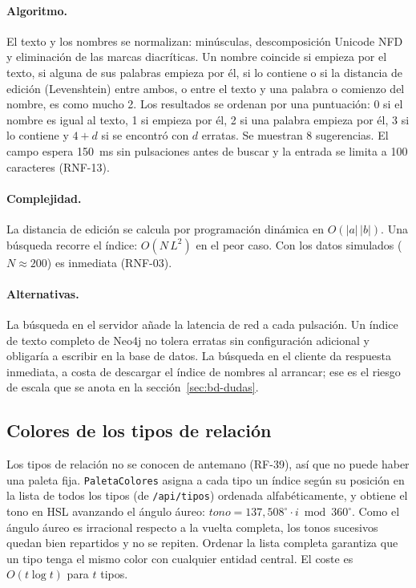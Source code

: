 \paragraph{Algoritmo.} El texto y los nombres se normalizan: minúsculas, descomposición Unicode NFD y eliminación de las marcas diacríticas. Un nombre coincide si empieza por el texto, si alguna de sus palabras empieza por él, si lo contiene o si la distancia de edición (Levenshtein) entre ambos, o entre el texto y una palabra o comienzo del nombre, es como mucho 2. Los resultados se ordenan por una puntuación: 0 si el nombre es igual al texto, 1 si empieza por él, 2 si una palabra empieza por él, 3 si lo contiene y $4+d$ si se encontró con $d$ erratas. Se muestran 8 sugerencias. El campo espera 150~ms sin pulsaciones antes de buscar y la entrada se limita a 100 caracteres (RNF-13).

\paragraph{Complejidad.} La distancia de edición se calcula por programación dinámica en $O(|a|\,|b|)$. Una búsqueda recorre el índice: $O(N\,L^2)$ en el peor caso. Con los datos simulados ($N\approx200$) es inmediata (RNF-03). %

\paragraph{Alternativas.} La búsqueda en el servidor añade la latencia de red a cada pulsación. Un índice de texto completo de Neo4j no tolera erratas sin configuración adicional y obligaría a escribir en la base de datos. La búsqueda en el cliente da respuesta inmediata, a costa de descargar el índice de nombres al arrancar; ese es el riesgo de escala que se anota en la sección~\ref{sec:bd-dudas}.

\subsection{Colores de los tipos de relación}
\label{sec:alg-colores}

Los tipos de relación no se conocen de antemano (RF-39), así que no puede haber una paleta fija. \texttt{PaletaColores} asigna a cada tipo un índice según su posición en la lista de todos los tipos (de \texttt{/api/tipos}) ordenada alfabéticamente, y obtiene el tono en HSL avanzando el ángulo áureo: $tono = 137{,}508^\circ\cdot i \bmod 360^\circ$. Como el ángulo áureo es irracional respecto a la vuelta completa, los tonos sucesivos quedan bien repartidos y no se repiten. Ordenar la lista completa garantiza que un tipo tenga el mismo color con cualquier entidad central. El coste es $O(t\log t)$ para $t$ tipos.

